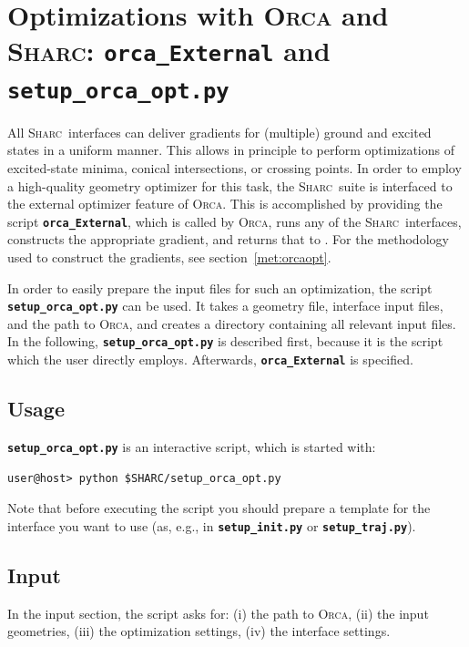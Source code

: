 \documentclass[a4paper,10pt,DIV=15,openany,twoside=false]{scrbook}
\newcommand{\sharc}{\textsc{Sharc}}
\newcommand{\ttt}[1]{\textbf{\texttt{#1}}}
\begin{document}

\section{Optimizations with \textsc{Orca} and \sharc: \ttt{orca\_External} and \ttt{setup\_orca\_opt.py}}\label{sec:Orca_External}

All \sharc\ interfaces can deliver gradients for (multiple) ground and excited states in a uniform manner.
This allows in principle to perform optimizations of excited-state minima, conical intersections, or crossing points.
In order to employ a high-quality geometry optimizer for this task, the \sharc\ suite is interfaced to the external optimizer feature of \textsc{Orca}.
This is accomplished by providing the script \ttt{orca\_External}, which is called by \textsc{Orca}, runs any of the \sharc\ interfaces, constructs the appropriate gradient, and returns that to .
For the methodology used to construct the gradients, see section~\ref{met:orcaopt}.

In order to easily prepare the input files for such an optimization, the script \ttt{setup\_orca\_opt.py} can be used.
It takes a geometry file, interface input files, and the path to \textsc{Orca}, and creates a directory containing all relevant input files.
In the following, \ttt{setup\_orca\_opt.py} is described first, because it is the script which the user directly employs. Afterwards, \ttt{orca\_External} is specified.

\subsection{Usage}

\ttt{setup\_orca\_opt.py} is an interactive script, which is started with:
\begin{verbatim}
user@host> python $SHARC/setup_orca_opt.py
\end{verbatim}
Note that before executing the script you should prepare a template for the interface you want to use (as, e.g., in \ttt{setup\_init.py} or \ttt{setup\_traj.py}).

\subsection{Input}

In the input section, the script asks for: (i) the path to \textsc{Orca}, (ii) the input geometries, (iii) the optimization settings, (iv) the interface settings.
\end{document}
